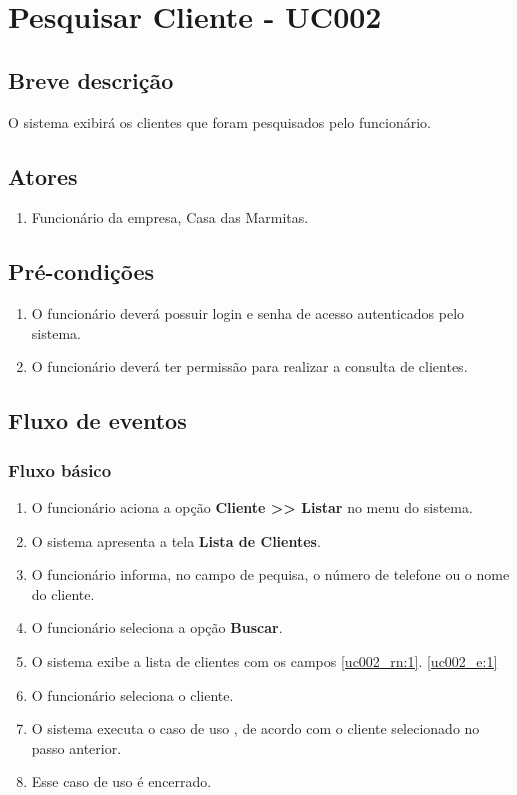 \chapter{Pesquisar Cliente - UC002} \label{uc002}

\section{Breve descrição}

O sistema exibirá os clientes que foram pesquisados pelo funcionário.

\section{Atores}

\begin{enumerate}
	\item Funcionário da empresa, Casa das Marmitas.
\end{enumerate}

\section{Pré-condições}

\begin{enumerate}
	\item O funcionário deverá possuir login e senha de acesso autenticados pelo sistema.
	\item O funcionário deverá ter permissão para realizar a consulta de clientes.
\end{enumerate}

\section{Fluxo de eventos}

\subsection{Fluxo básico}

\begin{enumerate}[label=P\arabic*]
	\item O funcionário aciona a opção \textbf{Cliente >> Listar} no menu do sistema.
	\item O sistema apresenta a tela \textbf{Lista de Clientes}.	
	\item O funcionário informa, no campo de pequisa, o número de telefone ou o nome do cliente. \label{uc002_p:3}
	\item O funcionário seleciona a opção \textbf{Buscar}. \label{uc002_p:4}
	\item O sistema exibe a lista de clientes com os campos \ref{uc002_rn:1}. \ref{uc002_e:1}
	\item O funcionário seleciona o cliente.
	\item O sistema executa o caso de uso , de acordo com o cliente selecionado no passo anterior.
	\item Esse caso de uso é encerrado.
\end{enumerate}

